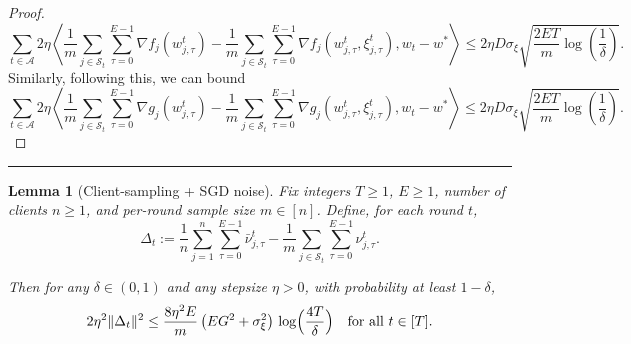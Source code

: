 \documentclass{article} %
\newtheorem{lemma}[]{Lemma}
\def\A{{\mathcal A}}
\def\S{{\mathcal S}}
\newcommand{\inner}[2]{\left\langle #1, #2 \right\rangle}
\begin{document}
\begin{proof}
\begin{equation}
        \sum_{t \in \A} 2\eta\inner{\frac{1}{m}\sum_{j\in \S_t}\sum_{\tau=0}^{E-1}\nabla f_j(w_{j,\tau}^t) -  \frac{1}{m}\sum_{j\in \S_t}\sum_{\tau=0}^{E-1}\nabla f_j(w_{j,\tau}^t, \xi_{j,\tau}^t)}{w_t-w^*} \leq 2\eta D \sigma_\xi\sqrt{\frac{2E T}{m}\log(\frac{1}{\delta})}.
    \end{equation} 
    Similarly, following this, we can bound 
    \begin{equation}
        \label{eq:prob_inner_final_constraint_data}
        \sum_{t \in \A} 2\eta\inner{\frac{1}{m}\sum_{j\in \S_t}\sum_{\tau=0}^{E-1}\nabla g_j(w_{j,\tau}^t) -  \frac{1}{m}\sum_{j\in \S_t}\sum_{\tau=0}^{E-1}\nabla g_j(w_{j,\tau}^t, \xi_{j,\tau}^t)}{w_t-w^*} \leq 2\eta D \sigma_\xi\sqrt{\frac{2E T}{m}\log(\frac{1}{\delta})}.
    \end{equation}
\end{proof}
\hrule
\begin{lemma}[Client-sampling + SGD noise]
\label{lem:hp_sampling_noise}
Fix integers $T\ge1$, $E\ge1$, number of clients $n\ge1$, and per-round sample size $m\in[n]$.
Define, for each round $t$,
\[
\Delta_t
:=
\frac{1}{n} \sum_{j=1}^n \sum_{\tau=0}^{E-1} \bar{\nu}_{j,\tau}^t
-
\frac{1}{m} \sum_{j\in \mathcal{S}_t}  \sum_{\tau=0}^{E-1} \nu_{j,\tau}^t.
\]

Then for any $\delta\in(0,1)$ and any stepsize $\eta>0$, with probability at least $1-\delta$,
\begin{equation}
    \label{eq:hp_sampling_noise_bound}
    2\eta^2 \|\Delta_t\|^2
    \le
    \frac{8\eta^2 E}{m}\,\bigl(EG^2+\sigma_\xi^2\bigr)\,
    \log \Bigl(\frac{4T}{\delta}\Bigr)
    \quad\text{for all } t\in [T].
\end{equation}
\end{lemma}
\end{document}
